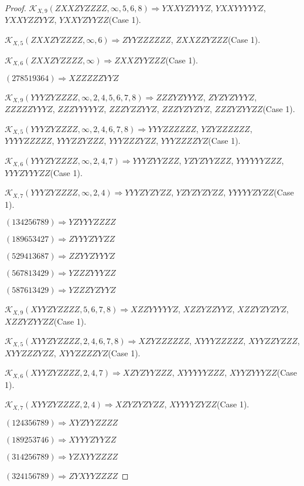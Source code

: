 \documentclass[12pt]{article}
\theoremstyle{plain}
\theoremstyle{definition}
\theoremstyle{remark}
\newcommand{\fancy}[1]{\mathcal{#1}}
\def\K{\fancy{K}}
\begin{document}
\begin{proof}
	$\K_{X,9}(ZXXZYZZZZ,\infty,5, 6, 8)\Rightarrow $$YXXYZYYYZ$, $YXXYYYYYZ$, $YXXYZZYYZ$, $YXXYZYYZZ$(Case 1).
	
	$\K_{X,5}(ZXXZYZZZZ,\infty,6)\Rightarrow $$ZYYZZZZZZ$, $ZXXZZYZZZ$(Case 1).
	
	$\K_{X,6}(ZXXZYZZZZ,\infty)\Rightarrow $$ZXXZYYZZZ$(Case 1).
	
	
	
	$(2 7 8 5 1 9 3 6 4)\Rightarrow XZZZZZYYZ$
	
	
	
	$\K_{X,9}(YYYZYZZZZ,\infty,2, 4, 5, 6, 7, 8)\Rightarrow $$ZZZYZYYYZ$, $ZYZYZYYYZ$, $ZZZZZYYYZ$, $ZZZYYYYYZ$, $ZZZYZZYYZ$, $ZZZYZYZYZ$, $ZZZYZYYZZ$(Case 1).
	
	$\K_{X,5}(YYYZYZZZZ,\infty,2, 4, 6, 7, 8)\Rightarrow $$YYYZZZZZZ$, $YZYZZZZZZ$, $YYYYZZZZZ$, $YYYZZYZZZ$, $YYYZZZYZZ$, $YYYZZZZYZ$(Case 1).
	
	$\K_{X,6}(YYYZYZZZZ,\infty,2, 4, 7)\Rightarrow $$YYYZYYZZZ$, $YZYZYYZZZ$, $YYYYYYZZZ$, $YYYZYYYZZ$(Case 1).
	
	$\K_{X,7}(YYYZYZZZZ,\infty,2, 4)\Rightarrow $$YYYZYZYZZ$, $YZYZYZYZZ$, $YYYYYZYZZ$(Case 1).
	
	
	
	$(1 3 4 2 5 6 7 8 9)\Rightarrow YZYYYZZZZ$
	
	$(1 8 9 6 5 3 4 2 7)\Rightarrow ZYYYZYYZZ$
	
	$(5 2 9 4 1 3 6 8 7)\Rightarrow ZZYYZYYYZ$
	
	$(5 6 7 8 1 3 4 2 9)\Rightarrow YZZZYYYZZ$
	
	$(5 8 7 6 1 3 4 2 9)\Rightarrow YZZZYZYYZ$
	
	
	
	$\K_{X,9}(XYYZYZZZZ,5, 6, 7, 8)\Rightarrow $$XZZYYYYYZ$, $XZZYZZYYZ$, $XZZYZYZYZ$, $XZZYZYYZZ$(Case 1).
	
	$\K_{X,5}(XYYZYZZZZ,2, 4, 6, 7, 8)\Rightarrow $$XZYZZZZZZ$, $XYYYZZZZZ$, $XYYZZYZZZ$, $XYYZZZYZZ$, $XYYZZZZYZ$(Case 1).
	
	$\K_{X,6}(XYYZYZZZZ,2, 4, 7)\Rightarrow $$XZYZYYZZZ$, $XYYYYYZZZ$, $XYYZYYYZZ$(Case 1).
	
	$\K_{X,7}(XYYZYZZZZ,2, 4)\Rightarrow $$XZYZYZYZZ$, $XYYYYZYZZ$(Case 1).
	
	
	
	$(1 2 4 3 5 6 7 8 9)\Rightarrow XYZYYZZZZ$
	
	$(1 8 9 2 5 3 7 4 6)\Rightarrow XYYYZYYZZ$
	
	$(3 1 4 2 5 6 7 8 9)\Rightarrow YZXYYZZZZ$
	
	$(3 2 4 1 5 6 7 8 9)\Rightarrow ZYXYYZZZZ$
	

\end{proof}
\end{document}
